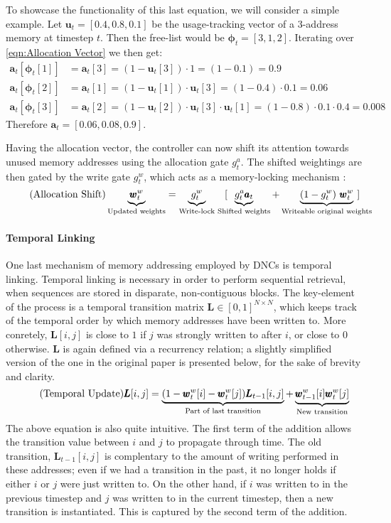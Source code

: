 \documentclass[]{article}
\begin{document}
To showcase the functionality of this last equation, we will consider a simple example. Let $\pmb{u}_t = [0.4, 0.8, 0.1]$ be the usage-tracking vector of a 3-address memory at timestep $t$. Then the free-list would be $\pmb{\phi}_t = [3, 1, 2]$. Iterating over \ref{eqn:Allocation Vector} we then get:
\begin{align*}
\pmb{a}_t[\pmb{\phi}_t[1]] &= \pmb{a}_t[3] = (1-\pmb{u}_t[3]) \cdot 1 = (1-0.1) =0.9 \\
\pmb{a}_t[\pmb{\phi}_t[2]] &= \pmb{a}_t[1] = (1-\pmb{u}_t[1]) \cdot \pmb{u}_t[3] = (1 - 0.4) \cdot 0.1 = 0.06\\
\pmb{a}_t[\pmb{\phi}_t[3]] &= \pmb{a}_t[2] = (1-\pmb{u}_t[2]) \cdot \pmb{u}_t[3] \cdot \pmb{u}_t[1] = (1-0.8) \cdot 0.1 \cdot 0.4 = 0.008
\end{align*}
Therefore $\pmb{a}_t = [0.06, 0.08, 0.9]$. 

Having the allocation vector, the controller can now shift its attention towards unused memory addresses using the allocation gate $g_t^a$. The shifted weightings are then gated by the write gate $g_t^w$, which acts as a memory-locking mechanism :
\[
\tag{Allocation Shift}
\underbrace{\pmb{w}_t^w}_{\text{\scriptsize Updated weights}} = \underbrace{g_t^w}_{\text{Write-lock}} \quad [ \hspace{-10pt} \underbrace{g_t^a \pmb{a}_t}_{\text{\scriptsize Shifted weights}} + \underbrace{(1-g_t^w) \ \pmb{w}_t^w}_{\text{\scriptsize Writeable original weights}} \hspace{-15pt}]
\]

\paragraph{Temporal Linking} One last mechanism of memory addressing employed by DNCs is temporal linking. Temporal linking is necessary in order to perform sequential retrieval, when sequences are stored in disparate, non-contiguous blocks. The key-element of the process is a temporal transition matrix $\pmb{L} \in [0,1]^{N\times N}$, which keeps track of the temporal order by which memory addresses have been written to. More conretely, $\pmb{L}[i,j]$ is close to $1$ if $j$ was strongly written to after $i$, or close to $0$ otherwise. $\pmb{L}$ is again defined via a recurrency relation; a slightly simplified version of the one in the original paper is presented below, for the sake of brevity and clarity.
\[
\tag{Temporal Update}
\pmb{L}[i,j] = \underbrace{(1 - \pmb{w}_t^w[i] - \pmb{w}_t^w[j]) \pmb{L}_{t-1}[i,j]}_{\text{\scriptsize Part of last transition}} + \underbrace{\pmb{w}_{t-1}^w[i] \pmb{w}_{t}^w[j]}_{\text{\scriptsize New transition}}
\]
The above equation is also quite intuitive. The first term of the addition allows the transition value between $i$ and $j$ to propagate through time. The old transition, $\pmb{L}_{t-1}[i,j]$ is complentary to the amount of writing performed in these addresses; even if we had a transition in the past, it no longer holds if either $i$ or $j$ were just written to. On the other hand, if $i$ was written to in the previous timestep and $j$ was written to in the current timestep, then a new transition is instantiated. This is captured by the second term of the addition. 
\end{document}
